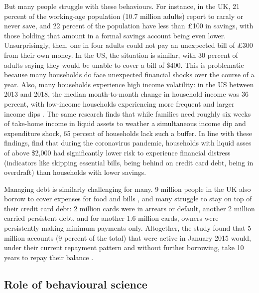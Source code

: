 But many people struggle with these behaviours. For instance, in the UK, 21
percent of the working-age population (10.7 million adults) report to raraly or
never save, and 22 percent of the population have less than \pounds100 in
savings, with those holding that amount in a formal savings account being even
lower.  Unsurprisingly, then, one in four adults could not pay an unexpected
bill of \pounds300 from their own money. In the US, the situation is similar,
with 30 percent of adults saying they would be unable to cover a bill of \$400.
This is problematic because many households do face unexpected financial shocks
over the course of a year. Also, many households experience high income
volatility: in the US between 2013 and 2018, the median month-to-month change
in household income was 36 percent, with low-income households experiencing
more frequent and larger income dips \citep{jpmorgan2019weathering}. The same
research finds that while families need roughly six weeks of take-home income
in liquid assets to weather a simultaneous income dip and expenditure shock, 65
percent of households lack such a buffer. In line with these findings,
\citet{roll2020income} find that during the coronavirus pandemic, households
with liquid asses of above \$2,000 had significantly lower risk to experience
financial distress (indicators like skipping essential bills, being behind on
credit card debt, being in overdraft) than households with lower savings. 

Managing debt is similarly challenging for many. 9 million people in the UK
also borrow to cover expenses for food and bills \citep{mps2018building}, and
many struggle to stay on top of their credit card debt: 2 million cards were in
arrears or default, another 2 million carried persistent debt, and for another
1.6 million cards, owners were persistently making minimum payments only.
Altogether, the study found that 5 million accounts (9 percent of the total)
that were active in January 2015 would, under their current repayment pattern
and without further borrowing, take 10 years to repay their balance
\citep{fca2016credit}.


\subsection{Role of behavioural science}%
\label{sub:role_of_behavioural_science}

